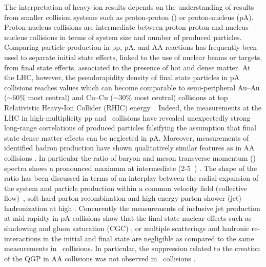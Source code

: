 The interpretation of heavy-ion results depends on the understanding of results from smaller collision systems such as proton-proton (\pp) or proton-nucleus (pA). 
Proton-nucleus collisions are intermediate between proton-proton and nucleus-nucleus collisions in terms of system size and number of produced particles. 
Comparing particle production in pp, pA, and AA reactions has frequently been used to separate initial state effects, linked to the use of nuclear beams or targets, from final state effects, associated to the presence of hot and
dense matter. 
At the LHC, however, the pseudorapidity density of final state particles in pA collisions reaches values which can become
comparable to semi-peripheral Au--Au ($\sim$60\% most central) and Cu--Cu ($\sim$30\% most central) collisions at top Relativistic Heavy-Ion Collider (RHIC) energy~\cite{Alver:2010ck}.
Indeed, the measurements at the LHC in high-multiplicity pp and \pPb\ collisions have revealed unexpectedly strong long-range correlations of produced particles \cite{Khachatryan:2010gv,CMS:2012qk,Abelev:2012ola,Aad:2012gla,Aad:2013fja,Chatrchyan:2013nka} falsifying the assumption that final state dense matter effects can be neglected in pA.
Moreover, measurements of identified hadron production \cite{Abelev:2013haa} have shown qualitatively similar features as in AA collisions \cite{Abelev:2013xaa,ABELEV:2013wsa}. 
In particular the ratio of baryon and meson transverse momentum (\pt) spectra shows a pronounced maximum at intermediate (2-5~\gevc) \pt. 
The shape of the ratio has been discussed in terms of an interplay between the radial expansion of the system and particle production within a common velocity field (collective flow)~\cite{Schnedermann:1993ws}, soft-hard parton recombination \cite{Fries:2003vb} and high energy parton shower (jet) hadronization at high \pT. 
Concurently the measurements of inclusive jet production at mid-rapidty in pA collisions \cite{Adam:2015hoa,Adam:2015xea} show that the final state nuclear effects such as shadowing and gluon saturation (CGC) \cite{McLerran:2001sr,Salgado:2011wc}, or multiple scatterings and hadronic re-interactions in the initial and final state \cite{Krzywicki:1979gv,Accardi:2007in} are negligible as compared to the same measurements in \pp\ collisions. 
In particular, the suppression related to the creation of the QGP in AA collisions was not observed in \pPb\ collisions \cite{Aad:2010bu,Chatrchyan:2012nia,Aad:2012vca,Abelev:2013kqa,Aad:2014bxa}.

